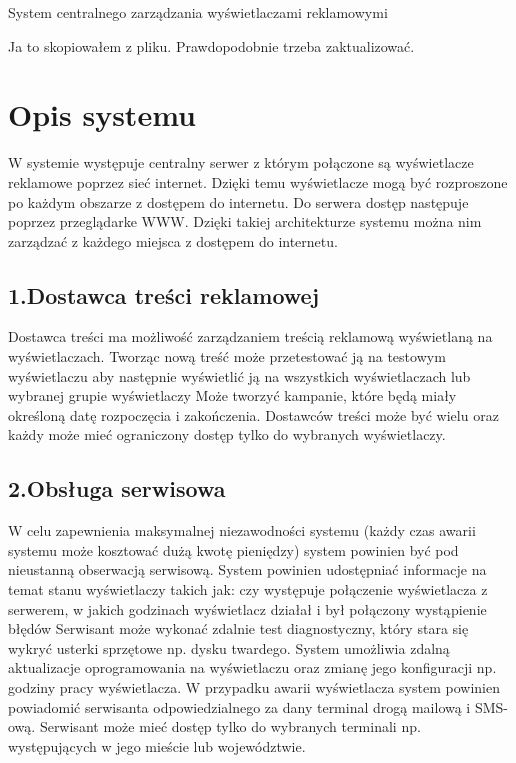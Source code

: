 \documentclass[a4paper,titlepage,twoside,openright]{report} %
\begin{document}
	
	{System centralnego zarządzania wyświetlaczami reklamowymi}

	\tableofcontents
	\newpage
	

		Ja to skopiowałem z pliku. Prawdopodobnie trzeba zaktualizować.
		\section{Opis systemu}
			W systemie występuje centralny serwer z którym połączone są wyświetlacze reklamowe poprzez sieć internet. Dzięki temu wyświetlacze mogą być rozproszone po każdym obszarze z dostępem do internetu. Do serwera dostęp następuje poprzez przeglądarke WWW. Dzięki takiej architekturze systemu można nim zarządzać z każdego miejsca z dostępem do internetu.
			\subsection{1.Dostawca treści reklamowej}
				Dostawca treści ma możliwość zarządzaniem treścią reklamową wyświetlaną na wyświetlaczach. Tworząc nową treść może przetestować ją na testowym wyświetlaczu aby następnie wyświetlić ją na wszystkich wyświetlaczach lub wybranej grupie wyświetlaczy Może tworzyć kampanie, które będą miały określoną datę rozpoczęcia i zakończenia. Dostawców treści może być wielu oraz każdy może mieć ograniczony dostęp tylko do wybranych wyświetlaczy.
			\subsection{2.Obsługa serwisowa}
				W celu zapewnienia maksymalnej niezawodności systemu (każdy czas awarii systemu może kosztować dużą kwotę pieniędzy) system powinien być pod nieustanną obserwacją serwisową. System powinien udostępniać informacje na temat stanu wyświetlaczy takich jak:
				czy występuje połączenie wyświetlacza z serwerem,
 				w jakich godzinach wyświetlacz działał i był połączony
 				wystąpienie błędów 
				Serwisant może wykonać zdalnie test diagnostyczny, który stara się wykryć usterki sprzętowe np. dysku twardego. System umożliwia zdalną aktualizacje oprogramowania na wyświetlaczu oraz zmianę jego konfiguracji np. godziny pracy wyświetlacza. W przypadku awarii wyświetlacza system powinien powiadomić serwisanta odpowiedzialnego za dany terminal drogą mailową i SMS-ową. Serwisant może mieć dostęp tylko do wybranych terminali np. występujących w jego mieście lub województwie. 
\end{document}
